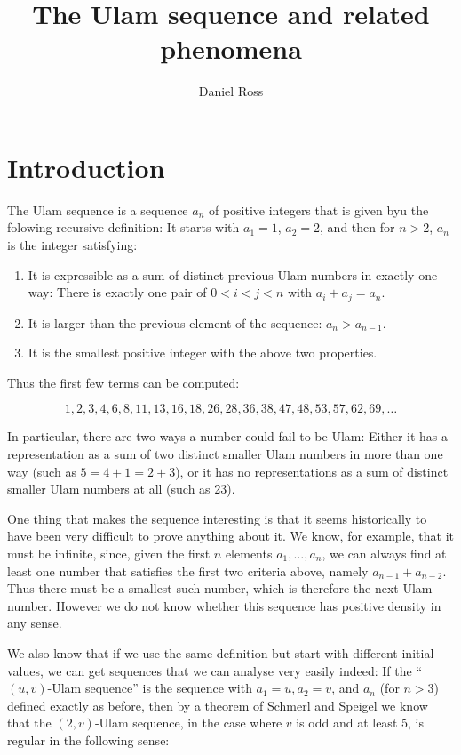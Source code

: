 \documentclass{report}
\title{The Ulam sequence and related phenomena}
\author{Daniel Ross}
\date{ }
\theoremstyle{remark}
\numberwithin{equation}{section}
\begin{document}
\maketitle

\tableofcontents


\chapter{Introduction}

The Ulam sequence is a sequence $a_n$ of positive integers that is given byu
the folowing recursive definition: It starts with $a_1 = 1$,
$a_2 = 2$, and then for $n > 2$, $a_n$ is the integer satisfying:
\begin{enumerate}
\item It is expressible as a sum of distinct previous Ulam numbers in
  exactly one way: There is exactly one pair of $0 < i < j < n$ with
  $a_i + a_j = a_n$.
\item It is larger than the previous element of the sequence: $a_n >
  a_{n-1}$.
\item It is the smallest positive integer with the above two
  properties.
\end{enumerate}

Thus the first few terms can be computed: 

\[1, 2, 3, 4, 6, 8, 11, 13, 16, 18, 26, 28, 36, 38, 47, 48, 53, 57, 62,
69, \ldots\]

In particular, there are two ways a number could fail to be Ulam:
Either it has a representation as a sum of two distinct smaller Ulam
numbers in more than one way (such as $5 = 4+1 = 2+3$), or it has no
representations as a sum of distinct smaller Ulam numbers at all (such
as 23).

One thing that makes the sequence interesting is that it seems
historically to have been very difficult to prove anything about it.
We know, for example, that it must be infinite, since, given the first
$n$ elements $a_1, \ldots, a_n$, we can always find at least one
number that satisfies the first two criteria above, namely
$a_{n-1} + a_{n-2}$.  Thus there must be a smallest such number, which
is therefore the next Ulam number.  However we do not know whether
this sequence has positive density in any sense.

We also know that if we use the same definition but start with
different initial values, we can get sequences that we can analyse
very easily indeed: If the ``$(u,v)$-Ulam sequence'' is the sequence
with $a_1 = u, a_2 = v$, and $a_n$ (for $n > 3$) defined exactly as
before, then by a theorem of Schmerl and Speigel
\cite{schmerl:jct1994} we know that the $(2,v)$-Ulam sequence, in the
case where $v$ is odd and at least 5, is regular in the following
sense:
\end{document}
